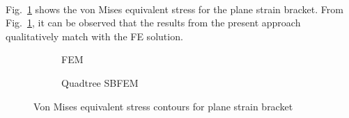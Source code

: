 \paragraph{}
Fig.~\ref{qdt_fig:bracket_stress_contour} shows the von Mises equivalent stress for the plane strain bracket.
From Fig.~\ref{qdt_fig:bracket_stress_contour}, it can be observed that the results from the present approach qualitatively match with the FE solution.
\begin{figure}[h!]
    \begin{subfigure}[b]{1\linewidth}
        \centering
        \caption{FEM}
    \end{subfigure}
    \begin{subfigure}[b]{1\linewidth}
        \centering
        \caption{Quadtree SBFEM}
    \end{subfigure}

    \caption{Von Mises equivalent stress contours for plane strain bracket}
    \label{qdt_fig:bracket_stress_contour}
\end{figure}